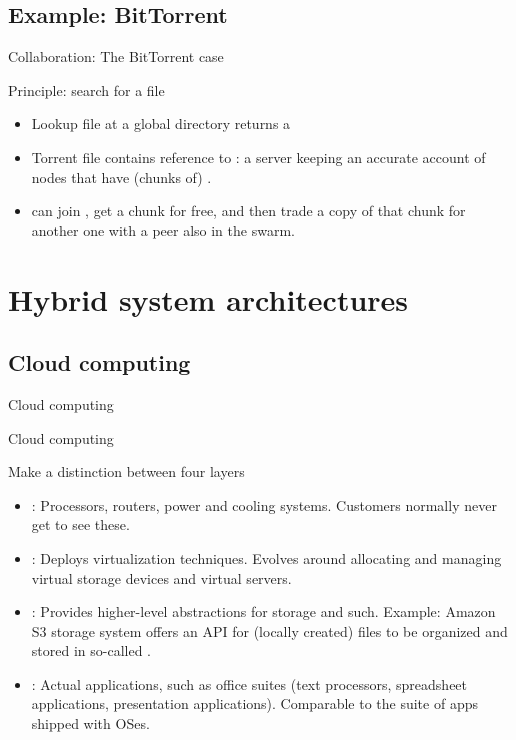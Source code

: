 \subsection{Example: BitTorrent}
\begin{slide}{Collaboration: The BitTorrent case}
  \begin{block}{Principle: search for a file }
    \begin{itemize}\tightlist
    \item Lookup file at a global directory \mathexpr{\Rightarrow} returns a 
    \item Torrent file contains reference to : a server keeping an accurate account of
       nodes that have (chunks of) .
    \item {} can join , get a chunk for free, and then trade a copy of that chunk for another
      one with a peer  also in the swarm.
    \end{itemize}
  \end{block}
  \begin{centerfig}
  \end{centerfig}
\end{slide}
\section{Hybrid system architectures}
\subsection{Cloud computing}
\begin{slide}{Cloud computing}
  \begin{centerfig}
  \end{centerfig}
\end{slide}
\begin{slide}{Cloud computing}
  \begin{block}{Make a distinction between four layers}
    \begin{itemize}
    \item {}: Processors, routers, power and cooling systems. Customers normally never get to see these.
    \item {}: Deploys virtualization techniques. Evolves around allocating and managing
      virtual storage devices and virtual servers.
    \item {}: Provides higher-level abstractions for storage and such. Example: Amazon S3 storage
      system offers an API for (locally created) files to be organized and stored in so-called .
    \item {}: Actual applications, such as office suites (text processors, spreadsheet
      applications, presentation applications). Comparable to the suite of apps shipped with OSes.
    \end{itemize}
  \end{block}
\end{slide}
